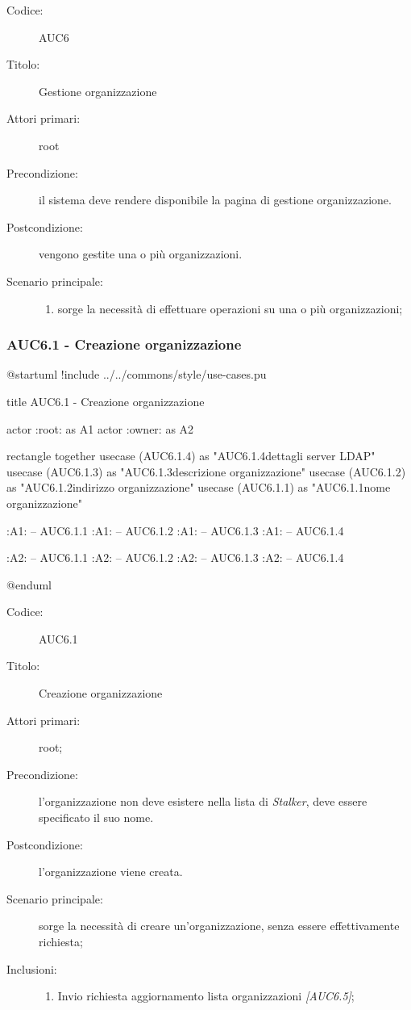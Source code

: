 \documentclass[casi-duso]{subfiles}
\begin{document}
\begin{description}
  \item[Codice:] AUC6
  \item[Titolo:] Gestione organizzazione
  \item[Attori primari:] root
  \item[Precondizione:] il sistema deve rendere disponibile la pagina di gestione organizzazione.
  \item[Postcondizione:] vengono gestite una o più organizzazioni.
  \item[Scenario principale:]
  \begin{enumerate}
    \item sorge la necessità di effettuare operazioni su una o più organizzazioni;
  \end{enumerate}
\end{description}

  \subsubsection{AUC6.1 - Creazione organizzazione}%
  \label{subsub:AUC6.1}

  \begin{plantuml}
  @startuml
  !include ../../commons/style/use-cases.pu

  title AUC6.1 - Creazione organizzazione

  actor :root: as A1
  actor :owner: as A2


  rectangle {
    together {
      usecase (AUC6.1.4) as "AUC6.1.4\nConfigurazione dettagli server LDAP"
      usecase (AUC6.1.3) as "AUC6.1.3\nInserisci descrizione organizzazione"
      usecase (AUC6.1.2) as "AUC6.1.2\nInserisci indirizzo organizzazione"
      usecase (AUC6.1.1) as "AUC6.1.1\nInserisci nome organizzazione"
    }
  }

  :A1: -- AUC6.1.1
  :A1: -- AUC6.1.2
  :A1: -- AUC6.1.3
  :A1: -- AUC6.1.4

  :A2: -- AUC6.1.1
  :A2: -- AUC6.1.2
  :A2: -- AUC6.1.3
  :A2: -- AUC6.1.4

  @enduml
  \end{plantuml}

  \begin{description}
    \item[Codice:] AUC6.1
    \item[Titolo:] Creazione organizzazione
    \item[Attori primari:] root;
    \item[Precondizione:] l'organizzazione non deve esistere nella lista di \emph{Stalker}, deve essere specificato il suo nome.
    \item[Postcondizione:] l'organizzazione viene creata.
    \item[Scenario principale:] sorge la necessità di creare un'organizzazione, senza essere effettivamente richiesta;
    \item[Inclusioni:]
    \begin{enumerate}
      \item Invio richiesta aggiornamento lista organizzazioni \emph{[AUC6.5]};
    \end{enumerate}
  \end{description}
\end{document}
